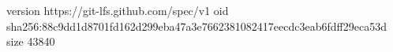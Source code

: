 version https://git-lfs.github.com/spec/v1
oid sha256:88c9dd1d8701fd162d299eba47a3e7662381082417eecdc3eab6fdff29eca53d
size 43840
